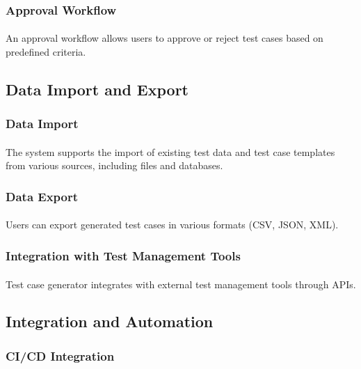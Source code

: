 \documentclass{article}
\begin{document}
\subsubsection{Approval Workflow}
\paragraph{}
An approval workflow allows users to approve or reject test cases based on predefined criteria.

\subsection{Data Import and Export}
\subsubsection{Data Import}
\paragraph{}
The system supports the import of existing test data and test case templates from various
sources, including files and databases.

\subsubsection{Data Export}
\paragraph{}
Users can export generated test cases in various formats (CSV, JSON, XML).

\subsubsection{Integration with Test Management Tools}
\paragraph{}
Test case generator integrates with external test management tools through APIs.

\subsection{Integration and Automation}
\subsubsection{CI/CD Integration}
\end{document}
